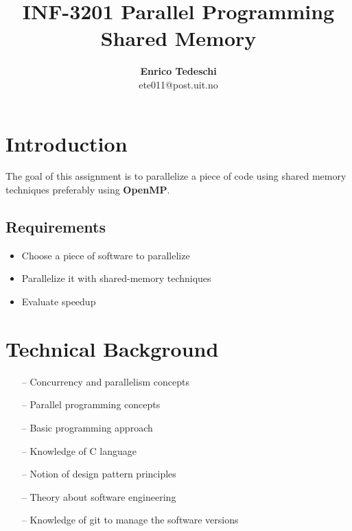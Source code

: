 \documentclass[11pt,conference]{IEEEtran}
\title{INF-3201 Parallel Programming
\newline
Shared Memory}
\author{\textbf{Enrico Tedeschi}\\ ete011@post.uit.no }
\begin{document}
\maketitle

\section{Introduction}
The goal of this assignment is to parallelize a piece of code using shared memory techniques preferably using \textbf{OpenMP}.
\subsection{Requirements}
\begin{itemize} 
\item Choose a piece of software to parallelize
\item Parallelize it with shared-memory techniques
\item Evaluate speedup
\end{itemize}


\section{Technical Background}

\begin{itemize} 
\item[--] Concurrency and parallelism concepts
\item[--] Parallel programming concepts
\item[--] Basic programming approach
\item[--] Knowledge of C language
\item[--] Notion of design pattern principles
\item[--] Theory about software engineering
\item[--] Knowledge of git to manage the software versions
\end{itemize}
\end{document}
